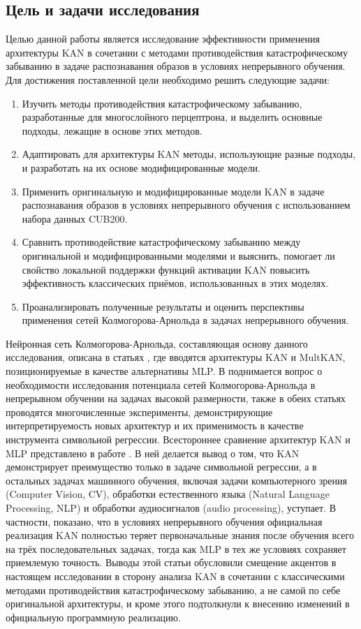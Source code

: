 \documentclass[a4paper,14pt]{extarticle}
\begin{document}
\subsection*{Цель и задачи исследования}
Целью данной работы является исследование эффективности применения архитектуры
KAN в сочетании с методами противодействия катастрофическому забыванию в задаче
распознавания образов в условиях непрерывного обучения. Для достижения
поставленной цели необходимо решить следующие задачи:
\begin{enumerate}
    \item Изучить методы противодействия катастрофическому забыванию,
        разработанные для многослойного перцептрона, и выделить основные
        подходы, лежащие в основе этих методов.
    \item Адаптировать для архитектуры KAN методы, использующие разные подходы,
        и разработать на их основе модифицированные модели.
    \item Применить оригинальную и модифицированные модели KAN в задаче
        распознавания образов в условиях непрерывного обучения с использованием
        набора данных CUB200.
    \item Сравнить противодействие катастрофическому забыванию между
        оригинальной и модифицированными моделями и выяснить, помогает ли
        свойство локальной поддержки функций активации KAN повысить
        эффективность классических приёмов, использованных в этих моделях.
    \item Проанализировать полученные результаты и оценить перспективы
        применения сетей Колмогорова-Арнольда в задачах непрерывного обучения.
\end{enumerate}
\pagebreak


Нейронная сеть Колмогорова-Арнольда, составляющая основу данного исследования,
описана в статьях \cite{liu2024kan,liu2024kan2}, где вводятся архитектуры KAN и
MultKAN, позиционируемые в качестве альтернативы MLP. В \cite{liu2024kan}
поднимается вопрос о необходимости исследования потенциала сетей
Колмогорова-Арнольда в непрерывном обучении на задачах высокой размерности,
также в обеих статьях проводятся многочисленные эксперименты, демонстрирующие
интерпретируемость новых архитектур и их применимость в качестве инструмента
символьной регрессии. Всестороннее сравнение архитектур KAN и MLP представлено в
работе \cite{yu2024kan}. В ней делается вывод о том, что KAN демонстрирует
преимущество только в задаче символьной регрессии, а в остальных задачах
машинного обучения, включая задачи компьютерного зрения (Computer Vision, CV),
обработки естественного языка (Natural Language Processing, NLP) и обработки
аудиосигналов (audio processing), уступает. В частности, показано, что в
условиях непрерывного обучения официальная реализация KAN \cite{pykan} полностью
теряет первоначальные знания после обучения всего на трёх последовательных
задачах, тогда как MLP в тех же условиях сохраняет приемлемую точность. Выводы
этой статьи обусловили смещение акцентов в настоящем исследовании в сторону
анализа KAN в сочетании с классическими методами противодействия
катастрофическому забыванию, а не самой по себе оригинальной архитектуры, и
кроме этого подтолкнули к внесению изменений в официальную программную
реализацию.
\end{document}
